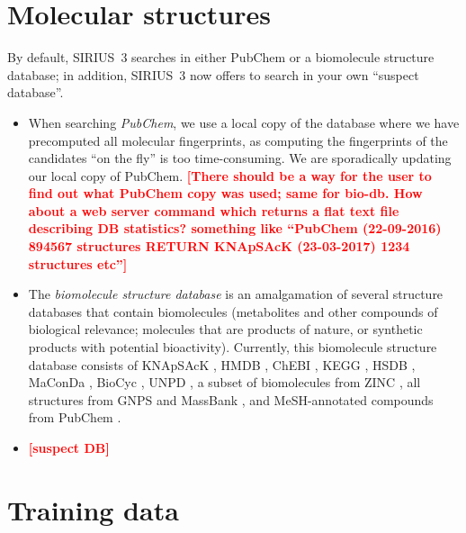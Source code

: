 \documentclass[letterpaper,10pt,openany,oneside]{sphinxmanual}
\newcommand{\todo}[1]{\xspace{\bfseries\sffamily\textcolor{red}{[#1]}}\xspace}
\begin{document}

\section{Molecular structures}

By default, SIRIUS~3 searches in either PubChem or a biomolecule structure
database; in addition, SIRIUS~3 now offers to search in your own ``suspect
database''.
%
\begin{itemize}
\item When searching \emph{PubChem}, we use a local copy of the database
  where we have precomputed all molecular fingerprints, as computing the
  fingerprints of the candidates ``on the fly'' is too time-consuming.  We
  are sporadically updating our local copy of PubChem.  \todo{There should be
  a way for the user to find out what PubChem copy was used; same for bio-db.
  How about a web server command which returns a flat text file describing DB
  statistics?  something like ``PubChem (22-09-2016) 894567 structures RETURN
  KNApSAcK (23-03-2017) 1234 structures etc''}

\item The \emph{biomolecule structure database} is an amalgamation of several
  structure databases that contain biomolecules (metabolites and other
  compounds of biological relevance; molecules that are products of nature,
  or synthetic products with potential bioactivity).  Currently, this
  biomolecule structure database consists of KNApSAcK \citep{shinbo06plant},
  HMDB \citep{wishart13hmdb}, ChEBI \citep{hastings13chebi},
  KEGG \citep{kanehisa16kegg}, HSDB \citep{fonger14national},
  MaConDa \citep{weber12maconda}, BioCyc \citep{caspi14metacyc},
  UNPD \citep{gu03unpd}, a subset of biomolecules from
  ZINC \citep{irwin12zinc}, all structures from GNPS \citep{wang16sharing}
  and MassBank \citep{horai10massbank}, and MeSH-annotated compounds from
  PubChem \citep{nelson01relationships, kim16pubchem}.

\item \todo{suspect DB}
\end{itemize}


\section{Training data}
\end{document}

